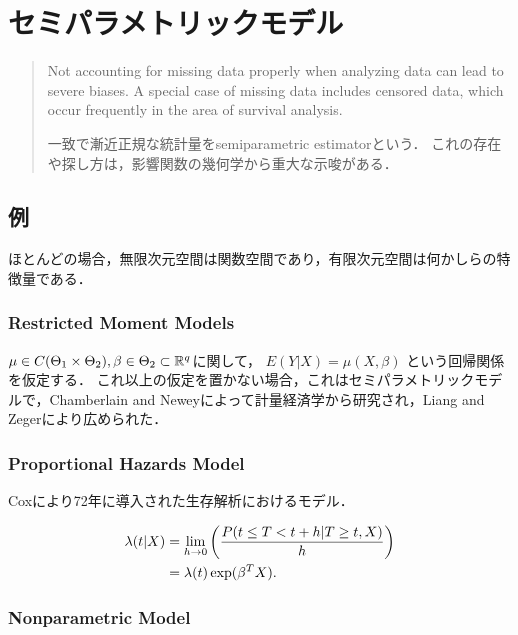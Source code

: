 \documentclass[uplatex,dvipdfmx]{jsreport}
\begin{document}
\chapter{セミパラメトリックモデル}

\begin{quotation}
    Not accounting for missing data properly when analyzing data can lead to severe biases.
    A special case of missing data includes censored data, which occur frequently in the area of survival analysis.\cite{Tsiatis}

    一致で漸近正規な統計量をsemiparametric estimatorという．
    これの存在や探し方は，影響関数の幾何学から重大な示唆がある．
\end{quotation}

\section{例}

\begin{tcolorbox}[colframe=ForestGreen, colback=ForestGreen!10!white,breakable,colbacktitle=ForestGreen!40!white,coltitle=black,fonttitle=\bfseries\sffamily,
title=]
    ほとんどの場合，無限次元空間は関数空間であり，有限次元空間は何かしらの特徴量である．
\end{tcolorbox}

\subsection{Restricted Moment Models}

$\mu\in C(\Theta_1\times\Theta_2),\beta\in\Theta_2\subset\mathbb{R}^q$に関して，
$E(Y|X)=\mu(X,\beta)$
という回帰関係を仮定する．
これ以上の仮定を置かない場合，これはセミパラメトリックモデルで，Chamberlain and Neweyによって計量経済学から研究され，Liang and Zegerにより広められた．

\subsection{Proportional Hazards Model}

Coxにより72年に導入された生存解析におけるモデル．

\begin{align*}
    \lambda(t|X)&=\lim_{h\to0}\left(\frac{P(t\le T<t+h|T\ge t,X)}{h}\right)\\
    &=\lambda(t)\exp(\beta^TX).
\end{align*}

\subsection{Nonparametric Model}
\end{document}
